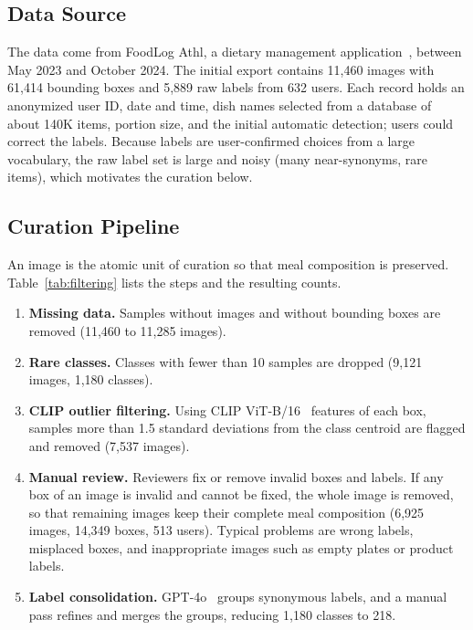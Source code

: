 \documentclass[sigconf, nonacm]{acmart}
\begin{document}
\subsection{Data Source}
The data come from FoodLog Athl, a dietary management application~\cite{nakamoto2022foodlog}, between May 2023 and October 2024. The initial export contains 11,460 images with 61,414 bounding boxes and 5,889 raw labels from 632 users. Each record holds an anonymized user ID, date and time, dish names selected from a database of about 140K items, portion size, and the initial automatic detection; users could correct the labels. Because labels are user-confirmed choices from a large vocabulary, the raw label set is large and noisy (many near-synonyms, rare items), which motivates the curation below.

\subsection{Curation Pipeline}
An image is the atomic unit of curation so that meal composition is preserved. Table~\ref{tab:filtering} lists the steps and the resulting counts.

\begin{enumerate}[leftmargin=1.4em,itemsep=0pt,topsep=2pt]
  \item \textbf{Missing data.} Samples without images and without bounding boxes are removed (11,460 to 11,285 images).
  \item \textbf{Rare classes.} Classes with fewer than 10 samples are dropped (9,121 images, 1,180 classes).
  \item \textbf{CLIP outlier filtering.} Using CLIP ViT-B/16~\cite{CLIP} features of each box, samples more than 1.5 standard deviations from the class centroid are flagged and removed (7,537 images).
  \item \textbf{Manual review.} Reviewers fix or remove invalid boxes and labels. If any box of an image is invalid and cannot be fixed, the whole image is removed, so that remaining images keep their complete meal composition (6,925 images, 14,349 boxes, 513 users). Typical problems are wrong labels, misplaced boxes, and inappropriate images such as empty plates or product labels.
  \item \textbf{Label consolidation.} GPT-4o~\cite{achiam2023gpt} groups synonymous labels, and a manual pass refines and merges the groups, reducing 1,180 classes to 218.
\end{enumerate}
\end{document}
